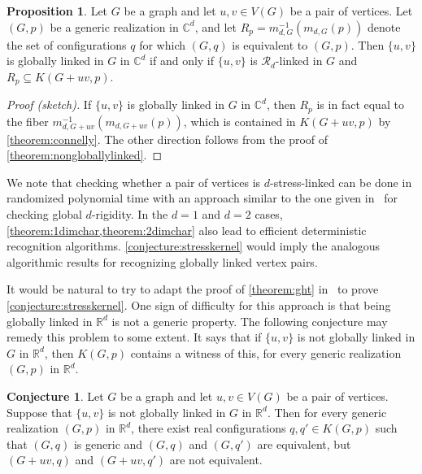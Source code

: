 \documentclass[11pt,a4paper,dvipsnames]{scrartcl}
\theoremstyle{definition}
\newtheorem{conjecture}[theorem]{Conjecture}
\newtheorem{proposition}[theorem]{Proposition}
\newcommand{\RR}{\mathbb{R}}
\newcommand{\CC}{\mathbb{C}}
\newcommand{\strongly}[1]{${#1}$-stress-linked}
\newcommand{\sharedstresskernel}[1]{K}
\begin{document}
\begin{proposition}\label{proposition:globallylinkedchar}
    Let $G$ be a graph and let $u,v \in V(G)$ be a pair of vertices. Let $(G,p)$ be a generic realization in $\CC^d$, and let $R_p = m_{d,G}^{-1}(m_{d,G}(p))$ denote the set of configurations $q$ for which $(G,q)$ is equivalent to $(G,p)$. Then $\{u,v\}$ is globally linked in $G$ in $\CC^d$ if and only if $\{u,v\}$ is $\mathcal{R}_d$-linked in $G$ and $R_p \subseteq \sharedstresskernel{d}(G+uv,p)$.
\end{proposition}
\begin{proof}[Proof (sketch)]
    If $\{u,v\}$ is globally linked in $G$ in $\CC^d$, then $R_p$ is in fact equal to the fiber $m_{d,G+uv}^{-1}(m_{d,G+uv}(p))$, which is contained in $\sharedstresskernel{d}(G+uv,p)$ by \cref{theorem:connelly}. The other direction follows from the proof of \cref{theorem:nongloballylinked}.
\end{proof}

We note that checking whether a pair of vertices is \strongly{d} can be done in randomized polynomial time with an approach similar to the one given in~\cite[Section 5]{gortler.etal_2010} for checking global $d$-rigidity. In the $d = 1$ and $d = 2$ cases, \cref{theorem:1dimchar,theorem:2dimchar} also lead to efficient deterministic recognition algorithms. \cref{conjecture:stresskernel} would imply the analogous algorithmic results for recognizing globally linked vertex pairs.

It would be natural to try to adapt the proof of \cref{theorem:ght} in~\cite{gortler.etal_2010} to prove \cref{conjecture:stresskernel}. One sign of difficulty for this approach is that being globally linked in $\RR^d$ is not a generic property.
The following conjecture may remedy this problem to some extent. It says that if $\{u,v\}$ is not globally linked in $G$ in $\RR^d$, then $\sharedstresskernel{d}(G,p)$ contains a witness of this, for every generic realization $(G,p)$ in $\RR^d$.

\begin{conjecture}
    Let $G$ be a graph and let $u,v \in V(G)$ be a pair of vertices. Suppose that $\{u,v\}$ is not globally linked in $G$ in $\RR^d$. Then for every generic realization $(G,p)$ in $\RR^d$, there exist real configurations $q,q' \in \sharedstresskernel{d}(G,p)$ such that $(G,q)$ is generic and $(G,q)$ and $(G,q')$ are equivalent, but $(G+uv,q)$ and $(G+uv,q')$ are not equivalent.
\end{conjecture}
\end{document}
